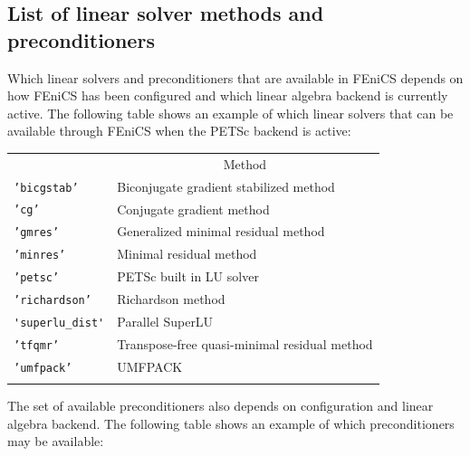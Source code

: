 \documentclass[graybox,envcountchap,sectrefs,final]{svmonodo}
\begin{document}
\subsection{List of linear solver methods and preconditioners}
\label{ftut:app:solver:prec}


Which linear solvers and preconditioners that are available
in FEniCS depends on how FEniCS has been configured and which
linear algebra backend is currently active. The following table
shows an example of which linear solvers that can be available
through FEniCS when the PETSc backend is active:



{\small   %

\vspace{4mm}

\begin{tabular}{ll}
\hline\noalign{\smallskip}
\multicolumn{1}{c}{ Name } & \multicolumn{1}{c}{ Method } \\
\noalign{\smallskip}\svhline\noalign{\smallskip}
\texttt{'bicgstab'}     & Biconjugate gradient stabilized method       \\
\texttt{'cg'}           & Conjugate gradient method                    \\
\texttt{'gmres'}        & Generalized minimal residual method          \\
\texttt{'minres'}       & Minimal residual method                      \\
\texttt{'petsc'}        & PETSc built in LU solver                     \\
\texttt{'richardson'}   & Richardson method                            \\
\Verb!'superlu_dist'! & Parallel SuperLU                             \\
\texttt{'tfqmr'}        & Transpose-free quasi-minimal residual method \\
\texttt{'umfpack'}      & UMFPACK                                      \\
\noalign{\smallskip}\hline\noalign{\smallskip}
\end{tabular}

\vspace{4mm}

}


\noindent
The set of available preconditioners also depends on configuration and
linear algebra backend. The following table shows an example of which
preconditioners may be available:
\end{document}
